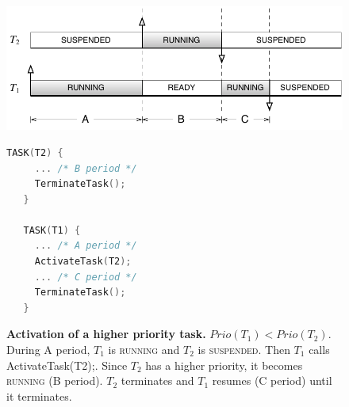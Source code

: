 \begin{figure}[htbp] %
   \centering
   \begin{minipage}[c]{.6\linewidth}
   \includegraphics[scale=.7]{pictures/schedulingT1hp.pdf}
   \end{minipage}\hfill
   \begin{minipage}[c]{.3\linewidth}
   \begin{lstlisting}[language=C]
   TASK(T2) {
     ... /* B period */
     TerminateTask();
   }
   
   TASK(T1) {
     ... /* A period */
     ActivateTask(T2);
     ... /* C period */
     TerminateTask();
   }
 \end{lstlisting}
   \end{minipage}
   \caption{{\bfseries Activation of a higher priority task.} $Prio(T_1) < Prio(T_2)$. During A period, $T_1$ is {\sffamily\scshape running} and $T_2$ is {\sffamily\scshape suspended}. Then $T_1$ calls {\upshape\ttfamily ActivateTask(T2);}. Since $T_2$ has a higher priority, it becomes {\sffamily\scshape running} (B period).  $T_2$ terminates and $T_1$ resumes (C period) until it terminates.}
   \label{fig:scheduleT1hp}
\end{figure} 


